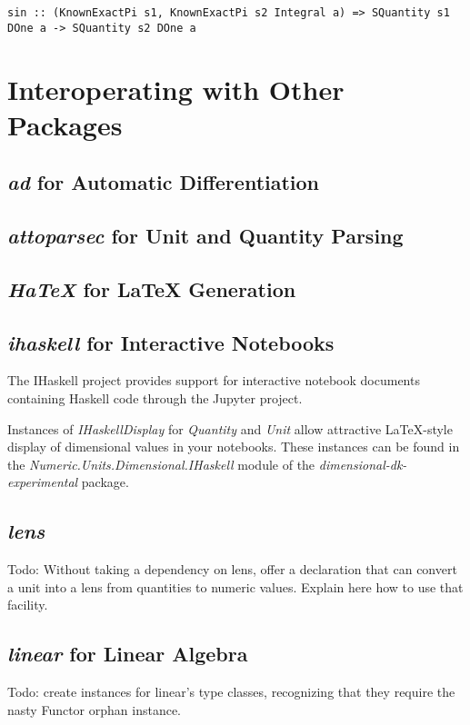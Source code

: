 \documentclass[12pt]{report}
\newcommand{\packagename}[1]{\textit{#1}}
\newcommand{\experimentalpackage}{\packagename{dimensional-dk-experimental}}
\newcommand{\classname}[1]{\textit{#1}}
\newcommand{\typename}[1]{\textit{#1}}
\newcommand{\modulename}[1]{\textit{#1}}
\newcommand{\submodule}[1]{\modulename{Numeric.Units.Dimensional.{#1}}}
\begin{document}
\begin{lstlisting}
sin :: (KnownExactPi s1, KnownExactPi s2 Integral a) => SQuantity s1 DOne a -> SQuantity s2 DOne a
\end{lstlisting}

\chapter{Interoperating with Other Packages}

\section{\packagename{ad} for Automatic Differentiation}
\section{\packagename{attoparsec} for Unit and Quantity Parsing}
\section{\packagename{HaTeX} for \LaTeX{} Generation}
\section{\packagename{ihaskell} for Interactive Notebooks}

The IHaskell project provides support for interactive notebook documents containing
Haskell code through the Jupyter project.

Instances of \classname{IHaskellDisplay} for \typename{Quantity} and \typename{Unit}
allow attractive \LaTeX{}-style display of dimensional values in your notebooks. These
instances can be found in the \submodule{IHaskell} module of the \experimentalpackage{}
package.

\section{\packagename{lens}}

Todo: Without taking a dependency on lens, offer a declaration that can convert a unit into a lens from quantities to numeric values.
Explain here how to use that facility.

\section{\packagename{linear} for Linear Algebra}

Todo: create instances for linear's type classes, recognizing that they require the nasty Functor orphan instance.
\end{document}
